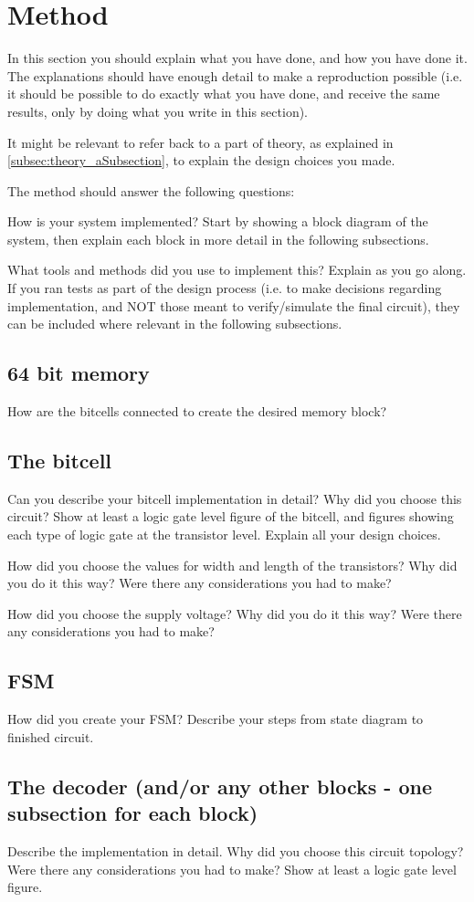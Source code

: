 \section{Method}
In this section you should explain what you have done, and how you have done it. The explanations should have enough detail to make a reproduction possible (i.e. it should be possible to do exactly what you have done, and receive the same results, only by doing what you write in this section).


It might be relevant to refer back to a part of theory, as explained in \autoref{subsec:theory_aSubsection}, to explain the design choices you made.

The method should answer the following questions:

How is your system implemented? Start by showing a block diagram of the system, then explain each block in more detail in the following subsections.

What tools and methods did you use to implement this? Explain as you go along. If you ran tests as part of the design process (i.e. to make decisions regarding implementation, and NOT those meant to verify/simulate the final circuit), they can be included where relevant in the following subsections.

\subsection{64 bit memory}
How are the bitcells connected to create the desired memory block?



\subsection{The bitcell}
Can you describe your bitcell implementation in detail? Why did you choose this circuit? Show at least a logic gate level figure of the bitcell, and figures showing each type of logic gate at the transistor level. Explain all your design choices.

How did you choose the values for width and length of the transistors? Why did you do it this way? Were there any considerations you had to make?

How did you choose the supply voltage? Why did you do it this way? Were there any considerations you had to make?



\subsection{FSM}
How did you create your FSM? Describe your steps from state diagram to finished circuit.

\subsection{The decoder (and/or any other blocks - one subsection for each block)}
Describe the implementation in detail. Why did you choose this circuit topology? Were there any considerations you had to make? Show at least a logic gate level figure.
